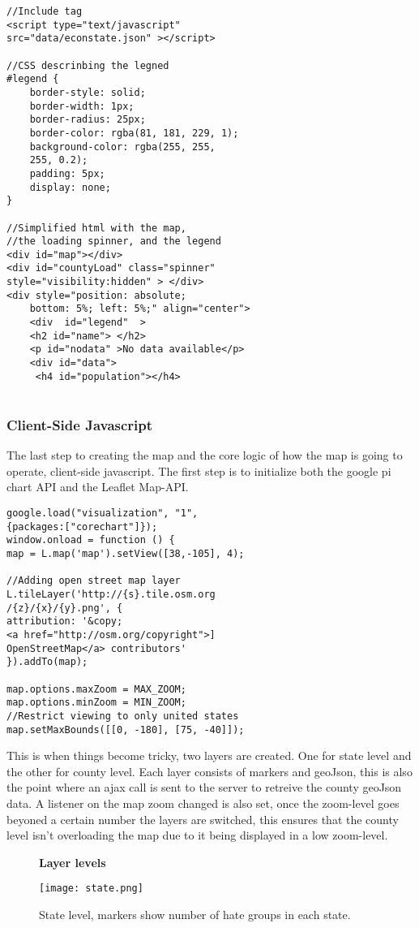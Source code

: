 \documentclass[twoside]{article}
\begin{document}
\begin{multicols}{2}
\begin{verbatim}
//Include tag
<script type="text/javascript" 
src="data/econstate.json" ></script>
   
//CSS descrinbing the legned
#legend {
    border-style: solid;
    border-width: 1px;
    border-radius: 25px;
    border-color: rgba(81, 181, 229, 1);
    background-color: rgba(255, 255, 
    255, 0.2);
    padding: 5px;
    display: none;
}

//Simplified html with the map, 
//the loading spinner, and the legend
<div id="map"></div>
<div id="countyLoad" class="spinner" 
style="visibility:hidden" > </div>
<div style="position: absolute; 
    bottom: 5%; left: 5%;" align="center">
    <div  id="legend"  >
    <h2 id="name"> </h2>
    <p id="nodata" >No data available</p>
    <div id="data">
     <h4 id="population"></h4>
     
\end{verbatim}
\subsubsection{Client-Side Javascript}
The last step to creating the map and the core logic of how the map is going to operate, client-side javascript.
The first step is to initialize both the google pi chart API and the Leaflet Map-API.

\begin{verbatim}
google.load("visualization", "1", 
{packages:["corechart"]});
window.onload = function () {
map = L.map('map').setView([38,-105], 4);
        
//Adding open street map layer
L.tileLayer('http://{s}.tile.osm.org
/{z}/{x}/{y}.png', {
attribution: '&copy;
<a href="http://osm.org/copyright">]
OpenStreetMap</a> contributors'
}).addTo(map);

map.options.maxZoom = MAX_ZOOM;
map.options.minZoom = MIN_ZOOM;
//Restrict viewing to only united states 
map.setMaxBounds([[0, -180], [75, -40]]);
\end{verbatim}
This is when things become tricky, two layers are created. One for state level and the other for county level. Each layer consists of markers and geoJson,
this is also the point where an ajax call is sent to the server to retreive the county geoJson data. A listener on the map zoom changed is also set, once the zoom-level goes beyoned a certain number the layers are switched, this ensures that the county level isn't overloading the map due to it 
being displayed in a low zoom-level. 

\begin{figure*} %
\centering
\textbf{Layer levels}\par\medskip
\texttt{[image: state.png]}
\caption 
{State level, markers show number of hate groups in each state.}
\end{figure*}


\end{multicols}
\end{document}
